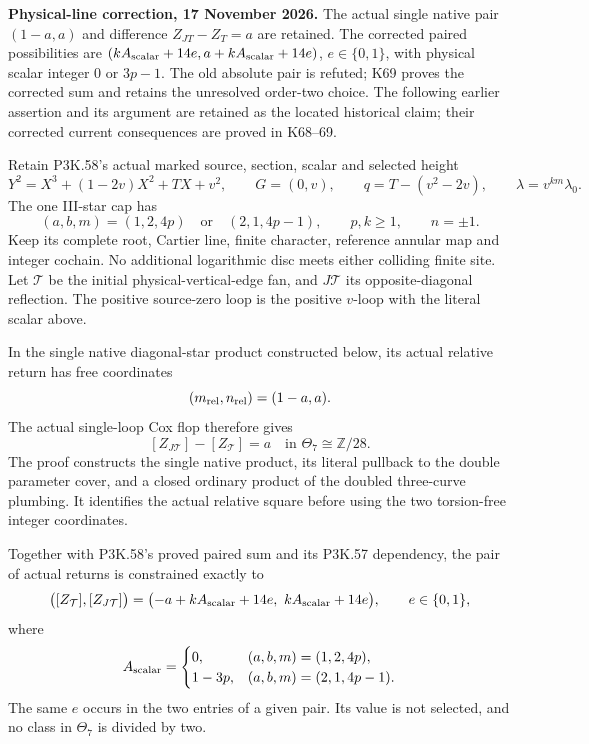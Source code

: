 \begin{theorem}\label{night:P3K.60}
\par\noindent\textbf{Physical-line correction, 17 November 2026.} The actual single native pair \((1-a,a)\) and difference \(Z_{JT}-Z_T=a\) are retained. The corrected paired possibilities are \((kA_{\rm scalar}+14e,a+kA_{\rm scalar}+14e)\), \(e\in\{0,1\}\), with physical scalar integer \(0\) or \(3p-1\). The old absolute pair is refuted; K69 proves the corrected sum and retains the unresolved order-two choice. The following earlier assertion and its argument are retained as the located historical claim; their corrected current consequences are proved in K68--69.\medskip\par 

Retain P3K.58's actual marked source, section, scalar and selected height
\[
 Y^2=X^3+(1-2v)X^2+TX+v^2,\qquad G=(0,v),\qquad
 q=T-(v^2-2v),\qquad \lambda=v^{km}\lambda_0 .
\]
The one III-star cap has
\[
 (a,b,m)=(1,2,4p)\quad\text{or}\quad(2,1,4p-1),
 \qquad p,k\ge1,\qquad n=\pm1 .
\]
Keep its complete root, Cartier line, finite character, reference
annular map and integer cochain. No additional logarithmic disc
meets either colliding finite site. Let \(\mathcal T\) be the initial
physical-vertical-edge fan, and \(J\mathcal T\) its opposite-diagonal
reflection. The positive source-zero loop is the positive \(v\)-loop
with the literal scalar above.

In the single native diagonal-star product constructed below, its
actual relative return has free coordinates
\[
                              (m_{\rm rel},n_{\rm rel})=(1-a,a).
\]
The actual single-loop Cox flop therefore gives
\[
                   [Z_{J\mathcal T}]-[Z_{\mathcal T}]
                                  =a\quad\text{in }\Theta_7\cong\mathbb Z/28.
\]
The proof constructs the single native product, its literal pullback
to the double parameter cover, and a closed ordinary product of
the doubled three-curve plumbing. It identifies the actual relative
square before using the two torsion-free integer coordinates.

Together with P3K.58's proved paired sum and its P3K.57 dependency,
the pair of actual returns is constrained exactly to
\[
 \bigl([Z_{\mathcal T}],[Z_{J\mathcal T}]\bigr)
   =\bigl(-a+kA_{\rm scalar}+14e,\ kA_{\rm scalar}+14e\bigr),
       \qquad e\in\{0,1\},
\]
where
\[
 A_{\rm scalar}=
 \begin{cases}
 0,&(a,b,m)=(1,2,4p),\\
 1-3p,&(a,b,m)=(2,1,4p-1).
 \end{cases}
\]
The same \(e\) occurs in the two entries of a given pair. Its value
is not selected, and no class in \(\Theta_7\) is divided by two.
\end{theorem}
